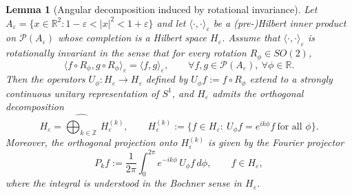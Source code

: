 \documentclass{amsart}
\numberwithin{equation}{section}
\newtheorem{lemma}[theorem]{Lemma}
\theoremstyle{definition}
\theoremstyle{remark}
\begin{document}
\begin{lemma}[Angular decomposition induced by rotational invariance]
\label{lem:angular-decomposition}
Let $A_\varepsilon=\{x\in\mathbb R^2:1-\varepsilon<|x|^2<1+\varepsilon\}$ and let
$\langle\cdot,\cdot \rangle_{\varepsilon}$ be a (pre-)Hilbert inner product on
$\mathcal P(A_\varepsilon)$ whose completion is a Hilbert space $H_\varepsilon$.
Assume that $\langle\cdot,\cdot \rangle_{\varepsilon}$ is \emph{rotationally invariant} in the sense that
for every rotation $R_\phi\in SO(2)$,
\begin{equation}\label{eq:rot-inv}
\langle f\circ R_\phi, g\circ R_\phi \rangle_{\varepsilon}
=
\langle f,g\rangle_{\varepsilon},
\qquad
\forall f,g\in\mathcal P(A_\varepsilon),\ \forall \phi\in\mathbb R.
\end{equation}
Then the operators $U_\phi:H_\varepsilon\to H_\varepsilon$ defined by
$U_\phi f := f\circ R_\phi$ extend to a strongly continuous unitary representation of $S^1$,
and $H_\varepsilon$ admits the orthogonal decomposition
\[
H_\varepsilon = \widehat{\bigoplus_{k\in\mathbb Z}}\,H_\varepsilon^{(k)},
\qquad
H_\varepsilon^{(k)} := \{f\in H_\varepsilon:\ U_\phi f = e^{ik\phi}f\ \text{for all }\phi\}.
\]
Moreover, the orthogonal projection onto $H_\varepsilon^{(k)}$ is given by the Fourier projector
\begin{equation}\label{eq:Pk}
P_k f := \frac{1}{2\pi}\int_0^{2\pi} e^{-ik\phi}\,U_\phi f\,d\phi,
\qquad f\in H_\varepsilon,
\end{equation}
where the integral is understood in the Bochner sense in $H_\varepsilon$.
\end{lemma}
\end{document}
